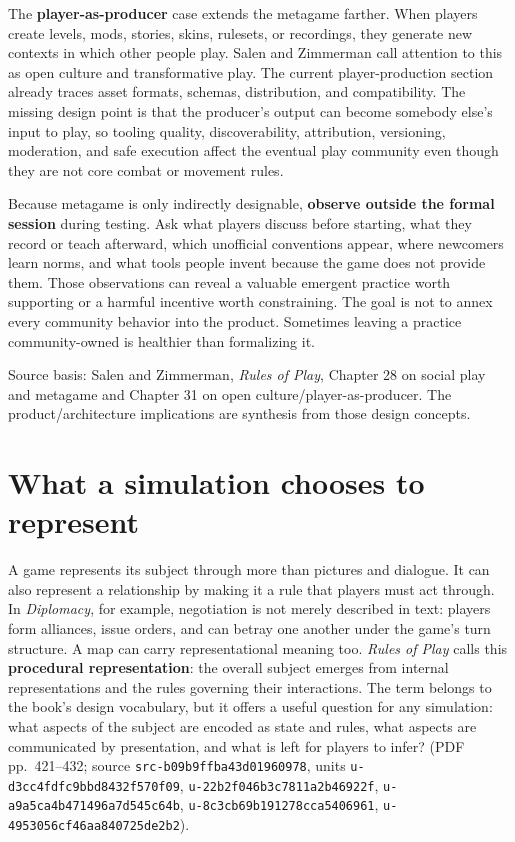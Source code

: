 The \textbf{player-as-producer} case extends the metagame farther. When players create levels, mods, stories, skins, rulesets, or recordings, they generate new contexts in which other people play. Salen and Zimmerman call attention to this as open culture and transformative play. The current player-production section already traces asset formats, schemas, distribution, and compatibility. The missing design point is that the producer's output can become somebody else's input to play, so tooling quality, discoverability, attribution, versioning, moderation, and safe execution affect the eventual play community even though they are not core combat or movement rules.

Because metagame is only indirectly designable, \textbf{observe outside the formal session} during testing. Ask what players discuss before starting, what they record or teach afterward, which unofficial conventions appear, where newcomers learn norms, and what tools people invent because the game does not provide them. Those observations can reveal a valuable emergent practice worth supporting or a harmful incentive worth constraining. The goal is not to annex every community behavior into the product. Sometimes leaving a practice community-owned is healthier than formalizing it.

Source basis: Salen and Zimmerman, \emph{Rules of Play}, Chapter 28 on social play and metagame and Chapter 31 on open culture/player-as-producer. The product/architecture implications are synthesis from those design concepts.

\section{What a simulation chooses to represent}\label{06-engine-ii-ch046-what-a-simulation-chooses-to-represent}

A game represents its subject through more than pictures and dialogue. It can also represent a relationship by making it a rule that players must act through. In \emph{Diplomacy}, for example, negotiation is not merely described in text: players form alliances, issue orders, and can betray one another under the game's turn structure. A map can carry representational meaning too. \emph{Rules of Play} calls this \textbf{procedural representation}: the overall subject emerges from internal representations and the rules governing their interactions. The term belongs to the book's design vocabulary, but it offers a useful question for any simulation: what aspects of the subject are encoded as state and rules, what aspects are communicated by presentation, and what is left for players to infer? (PDF pp.~421--432; source \texttt{src-b09b9ffba43d01960978}, units \texttt{u-d3cc4fdfc9bbd8432f570f09}, \texttt{u-22b2f046b3c7811a2b46922f}, \texttt{u-a9a5ca4b471496a7d545c64b}, \texttt{u-8c3cb69b191278cca5406961}, \texttt{u-4953056cf46aa840725de2b2}).

